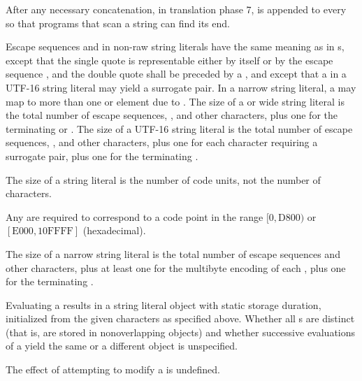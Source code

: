 \pnum
{}%
%
%
After any necessary concatenation, in translation phase
7,  is appended to every
 so that programs that scan a string can find its end.

\pnum
Escape sequences and  in non-raw string literals
have the same meaning as in s, except that
the single quote  is representable either by itself or by the escape sequence
, and the double quote  shall be preceded by a
\tcode{\textbackslash},
and except that a  in a
UTF-16 string literal may yield a surrogate pair.
%
In a narrow string literal, a  may map to more
than one  or  element due to . The
size of a  or wide string literal is the total number of
escape sequences, , and other characters, plus
one for the terminating  or
. The size of a UTF-16 string
literal is the total number of escape sequences,
, and other characters, plus one for each
character requiring a surrogate pair, plus one for the terminating
.
\begin{note}
The size of a 
string literal is the number of code units, not the number of
characters.
\end{note}
\begin{note}
Any  are required to
correspond to a code point in the range
$[0, \mathrm{D800})$ or $[\mathrm{E000}, \mathrm{10FFFF}]$ (hexadecimal).
\end{note}
The size of a narrow string literal is
the total number of escape sequences and other characters, plus at least
one for the multibyte encoding of each , plus
one for the terminating .

\pnum
Evaluating a  results in a string literal object
with static storage duration, initialized from the given characters as
specified above.
%
Whether all s are distinct (that is, are stored in
nonoverlapping objects) and whether successive evaluations of a
 yield the same or a different object is
unspecified.
\begin{note}
%
The effect of attempting to modify a  is undefined.
\end{note}

